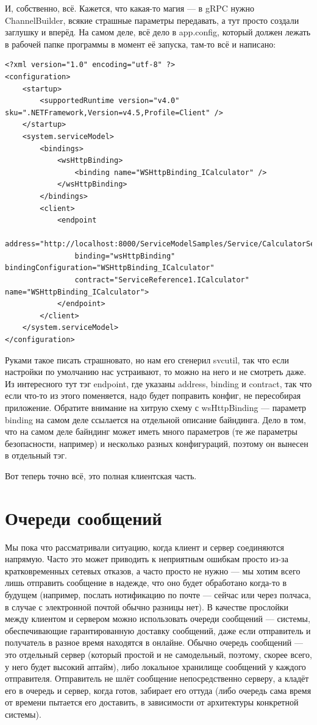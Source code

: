 \documentclass[a5paper]{article}
\begin{document}
И, собственно, всё. Кажется, что какая-то магия --- в gRPC нужно ChannelBuilder, всякие страшные параметры передавать, а тут просто создали заглушку и вперёд. На самом деле, всё дело в app.config, который должен лежать в рабочей папке программы в момент её запуска, там-то всё и написано: 

\begin{verbatim}
<?xml version="1.0" encoding="utf-8" ?>  
<configuration>  
    <startup>   
        <supportedRuntime version="v4.0" sku=".NETFramework,Version=v4.5,Profile=Client" />  
    </startup>  
    <system.serviceModel>  
        <bindings>  
            <wsHttpBinding>  
                <binding name="WSHttpBinding_ICalculator" />  
            </wsHttpBinding>  
        </bindings>  
        <client>  
            <endpoint 
                address="http://localhost:8000/ServiceModelSamples/Service/CalculatorService"  
                binding="wsHttpBinding" bindingConfiguration="WSHttpBinding_ICalculator"  
                contract="ServiceReference1.ICalculator" name="WSHttpBinding_ICalculator">  
            </endpoint>  
        </client>  
    </system.serviceModel>  
</configuration>
\end{verbatim}

Руками такое писать страшновато, но нам его сгенерил svcutil, так что если настройки по умолчанию нас устраивают, то можно на него и не смотреть даже. Из интересного тут тэг endpoint, где указаны address, binding и contract, так что если что-то из этого поменяется, надо будет поправить конфиг, не пересобирая приложение. Обратите внимание на хитрую схему с wsHttpBinding --- параметр binding на самом деле ссылается на отдельной описание байндинга. Дело в том, что на самом деле байндинг может иметь много параметров (те же параметры безопасности, например) и несколько разных конфигураций, поэтому он вынесен в отдельный тэг.

Вот теперь точно всё, это полная клиентская часть.

\section{Очереди сообщений}

Мы пока что рассматривали ситуацию, когда клиент и сервер соединяются напрямую. Часто это может приводить к неприятным ошибкам просто из-за кратковременных сетевых отказов, а часто просто не нужно --- мы хотим всего лишь отправить сообщение в надежде, что оно будет обработано когда-то в будущем (например, послать нотификацию по почте --- сейчас или через полчаса, в случае с электронной почтой обычно разницы нет). В качестве прослойки между клиентом и сервером можно использовать очереди сообщений --- системы, обеспечивающие гарантированную доставку сообщений, даже если отправитель и получатель в разное время находятся в онлайне. Обычно очередь сообщений --- это отдельный сервер (который простой и не самодельный, поэтому, скорее всего, у него будет высокий аптайм), либо локальное хранилище сообщений у каждого отправителя. Отправитель не шлёт сообщение непосредственно серверу, а кладёт его в очередь и сервер, когда готов, забирает его оттуда (либо очередь сама время от времени пытается его доставить, в зависимости от архитектуры конкретной системы).
\end{document}
